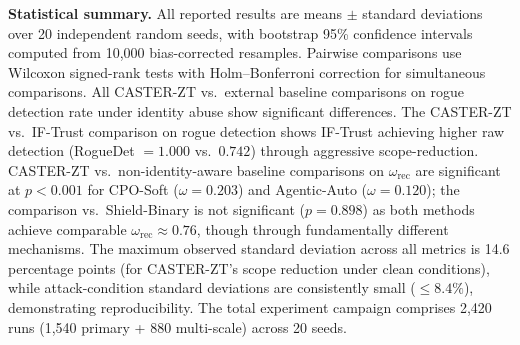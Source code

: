 \documentclass[10pt,journal,compsoc]{IEEEtran}
\begin{document}
\noindent\textbf{Statistical summary.}
All reported results are means $\pm$ standard deviations over 20 independent random seeds, with bootstrap 95\% confidence intervals computed from 10,000 bias-corrected resamples.
Pairwise comparisons use Wilcoxon signed-rank tests with Holm--Bonferroni correction for simultaneous comparisons.
All CASTER-ZT vs.\ external baseline comparisons on rogue detection rate under identity abuse show significant differences.  The CASTER-ZT vs.\ IF-Trust comparison on rogue detection shows IF-Trust achieving higher raw detection (RogueDet $= 1.000$ vs.\ $0.742$) through aggressive scope-reduction.
CASTER-ZT vs.\ non-identity-aware baseline comparisons on $\omega_{\mathrm{rec}}$ are significant at $p < 0.001$ for CPO-Soft ($\omega = 0.203$) and Agentic-Auto ($\omega = 0.120$); the comparison vs.\ Shield-Binary is not significant ($p = 0.898$) as both methods achieve comparable $\omega_{\mathrm{rec}} \approx 0.76$, though through fundamentally different mechanisms.
The maximum observed standard deviation across all metrics is 14.6 percentage points (for CASTER-ZT's scope reduction under clean conditions), while attack-condition standard deviations are consistently small ($\le 8.4\%$), demonstrating reproducibility.
The total experiment campaign comprises 2,420 runs (1,540 primary + 880 multi-scale) across 20 seeds.
\end{document}
